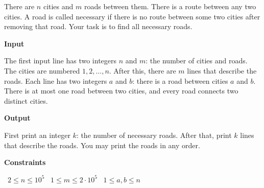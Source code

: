 There are $n$ cities and $m$ roads between them. There is a route between any two cities.
A road is called necessary if there is no route between some two cities after removing that road. Your task is to find all necessary roads.

\vspace{0.3cm}\noindent\textbf{Input}

The first input line has two integers $n$ and $m$: the number of cities and roads. The cities are numbered $1,2,\dots,n$.
After this, there are $m$ lines that describe the roads. Each line has two integers $a$ and $b$: there is a road between cities $a$ and $b$. There is at most one road between two cities, and every road connects two distinct cities.

\vspace{0.3cm}\noindent\textbf{Output}

First print an integer $k$: the number of necessary roads. After that, print $k$ lines that describe the roads. You may print the roads in any order.

\vspace{0.3cm}\noindent\textbf{Constraints}

\textbullet\ $2 \le n \le 10^5$
\textbullet\ $1 \le m \le 2 \cdot 10^5$
\textbullet\ $1 \le a,b \le n$